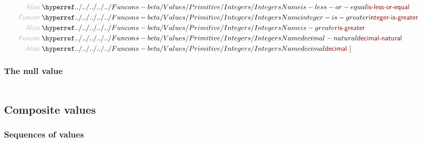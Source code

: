 \begin{align*}
  \KEY{Alias} ~ & \NAMEHYPER{../../../../../Funcons-beta/Values/Primitive}{Integers}{is-less-or-equal} \\
  \KEY{Funcon} ~ & \NAMEHYPER{../../../../../Funcons-beta/Values/Primitive}{Integers}{integer-is-greater} \\
  \KEY{Alias} ~ & \NAMEHYPER{../../../../../Funcons-beta/Values/Primitive}{Integers}{is-greater} \\
  \KEY{Funcon} ~ & \NAMEHYPER{../../../../../Funcons-beta/Values/Primitive}{Integers}{decimal-natural} \\
  \KEY{Alias} ~ & \NAMEHYPER{../../../../../Funcons-beta/Values/Primitive}{Integers}{decimal}
  ~ ]
\end{align*}
\subsubsection*{The null value}\hypertarget{the-null-value}{}\label{the-null-value}

\begin{align*}
  [ ~ 
  \KEY{Datatype} ~ & \NAMEHYPER{../../../../../Funcons-beta/Values/Primitive}{Null}{null-type} \\
  \KEY{Funcon} ~ & \NAMEHYPER{../../../../../Funcons-beta/Values/Primitive}{Null}{null-value} \\
  \KEY{Alias} ~ & \NAMEHYPER{../../../../../Funcons-beta/Values/Primitive}{Null}{null}
  ~ ]
\end{align*}
\subsection*{Composite values}\hypertarget{composite-values}{}\label{composite-values}

\subsubsection*{Sequences of values}\hypertarget{sequences-of-values}{}\label{sequences-of-values}

\begin{align*}
  [ ~ 
  \KEY{Funcon} ~ & \NAMEHYPER{../../../../../Funcons-beta/Values/Composite}{Sequences}{length} \\
  \KEY{Funcon} ~ & \NAMEHYPER{../../../../../Funcons-beta/Values/Composite}{Sequences}{index} \\
  \KEY{Funcon} ~ & \NAMEHYPER{../../../../../Funcons-beta/Values/Composite}{Sequences}{first} \\
  \KEY{Funcon} ~ & \NAMEHYPER{../../../../../Funcons-beta/Values/Composite}{Sequences}{second}
  ~ ]
\end{align*}
